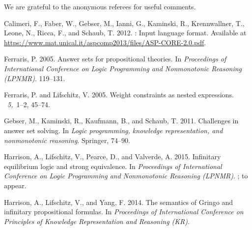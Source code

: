 \documentclass{tlp}
\begin{document}
We are grateful to the anonymous referees for useful comments.

\newpage

%
%

\begin{thebibliography}{}

{\sc Calimeri, F.}, {\sc Faber, W.}, {\sc Gebser, M.}, {\sc Ianni, G.}, {\sc
  Kaminski, R.}, {\sc Krennwallner, T.}, {\sc Leone, N.}, {\sc Ricca, F.}, {\sc
  and} {\sc Schaub, T.} 2012.
: Input language format.
\newblock Available at
  \url{https://www.mat.unical.it/aspcomp2013/files/ASP-CORE-2.0.pdf}.

{\sc Ferraris, P.} 2005.
\newblock Answer sets for propositional theories.
\newblock In {\em Proceedings of International Conference on Logic Programming
  and Nonmonotonic Reasoning ({LPNMR})}. 119--131.

{\sc Ferraris, P.} {\sc and} {\sc Lifschitz, V.} 2005.
\newblock Weight constraints as nested expressions.
~{\em 5,\/}~1--2,
  45--74.

{\sc Gebser, M.}, {\sc Kaminski, R.}, {\sc Kaufmann, B.}, {\sc and} {\sc
  Schaub, T.} 2011.
\newblock Challenges in answer set solving.
\newblock In {\em Logic programming, knowledge representation, and nonmonotonic
  reasoning}. Springer, 74--90.

{\sc Harrison, A.}, {\sc Lifschitz, V.}, {\sc Pearce, D.}, {\sc and} {\sc
  Valverde, A.} 2015.
\newblock Infinitary equilibrium logic and strong equivalence.
\newblock In {\em Proceedings of International Conference on Logic Programming
  and Nonmonotonic Reasoning ({LPNMR})}.
; to
  appear.

{\sc Harrison, A.}, {\sc Lifschitz, V.}, {\sc and} {\sc Yang, F.} 2014.
\newblock The semantics of {G}ringo and infinitary propositional formulas.
\newblock In {\em Proceedings of International Conference on Principles of
  Knowledge Representation and Reasoning (KR)}.


\end{thebibliography}
\end{document}
